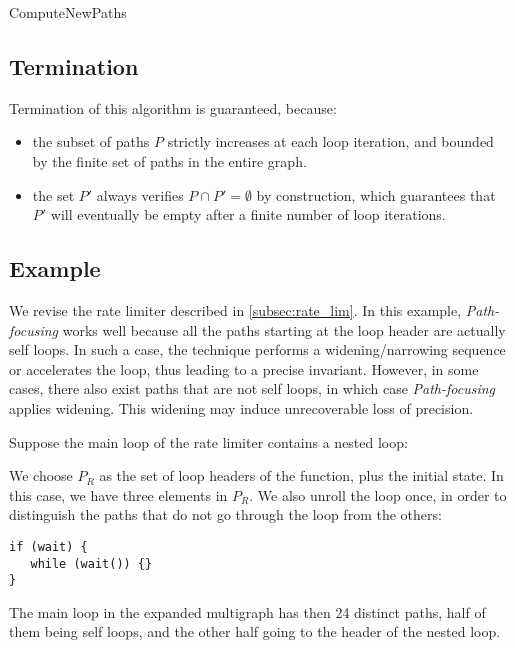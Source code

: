\documentclass[preprint]{sigplanconf}
\begin{document}
\begin{algorithm}
	\caption{ComputeNewPaths}
	\label{algo:computepaths}
	\begin{algorithmic}[1] 
	
	\end{algorithmic}
\end{algorithm}

\subsection{Termination}
Termination of this algorithm is guaranteed, because:
\begin{itemize}
\item 
the subset of paths $P$ strictly increases at each loop iteration, and bounded by the finite set of
paths in the entire graph. 
\item the set $P'$ always verifies $P \cap P' = \emptyset$ by construction, 
which guarantees that $P'$
will eventually be empty after a finite number of loop iterations.
\end{itemize}

\subsection{Example}

We revise the rate limiter described in \ref{subsec:rate_lim}. In this example,
\emph{Path-focusing} works well because all the paths starting at the
loop header are actually self loops. In such a case, the technique performs a
widening/narrowing sequence or accelerates the loop, thus leading to a precise
invariant. However, in some cases, there also exist paths that are not
self loops, in which case \emph{Path-focusing} applies widening. 
This widening may induce unrecoverable loss of precision.

Suppose the main loop of the rate limiter contains a nested loop:


We choose $P_R$ as the set of loop headers of the function, plus the initial
state. In this case, we have three elements in $P_R$.
We also unroll the loop once, in order to distinguish the paths that do not go
through the loop from the others:
\begin{lstlisting}[numbers=none]
if (wait) {
   while (wait()) {}
}
\end{lstlisting}

The main loop in the expanded multigraph has then 24 distinct paths, half of
them being self loops, and the other half going to the header of the nested loop.
\end{document}
